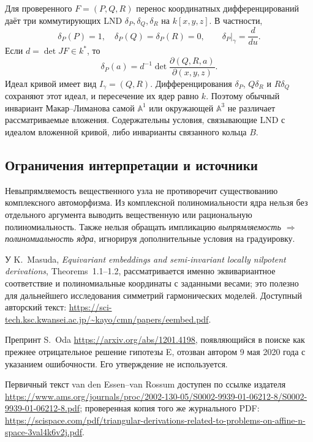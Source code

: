 Для проверенного $F=(P,Q,R)$ перенос координатных дифференцирований
даёт три коммутирующих LND $\delta_P,\delta_Q,\delta_R$ на
$k[x,y,z]$. В частности,
\[
 \delta_P(P)=1,\quad \delta_P(Q)=\delta_P(R)=0,
 \qquad\delta_P|_{\gamma}=\frac{d}{du}.
\]
Если $d=\det JF\in k^*$, то
\[
 \delta_P(a)=d^{-1}\det\frac{\partial(Q,R,a)}{\partial(x,y,z)}.
\]
Идеал кривой имеет вид $I_\gamma=(Q,R)$. Дифференцирования
$\delta_P$, $Q\delta_R$ и $R\delta_Q$ сохраняют этот идеал, и
пересечение их ядер равно $k$. Поэтому обычный инвариант
Макар--Лиманова самой $\mathbb A^1$ или окружающей $\mathbb A^3$
не различает рассматриваемые вложения. Содержательны условия,
связывающие LND с идеалом вложенной кривой, либо инварианты
связанного кольца $B$.

\subsection{Ограничения интерпретации и источники}

Невыпрямляемость вещественного узла не противоречит существованию
комплексного автоморфизма. Из комплексной полиномиальности ядра
нельзя без отдельного аргумента выводить вещественную или рациональную
полиномиальность. Также нельзя обращать импликацию
\emph{выпрямляемость $\Rightarrow$ полиномиальность ядра}, игнорируя
дополнительные условия на градуировку.

У K.~Masuda, \emph{Equivariant embeddings and semi-invariant locally
nilpotent derivations}, Theorems~1.1--1.2, рассматривается именно
эквивариантное соответствие и полиномиальные координаты с заданными
весами; это полезно для дальнейшего исследования симметрий гармонических
моделей. Доступный авторский текст:
\url{https://sci-tech.ksc.kwansei.ac.jp/~kayo/cmn/papers/eembed.pdf}.

Препринт S.~Oda \url{https://arxiv.org/abs/1201.4198}, появляющийся
в поиске как прежнее отрицательное решение гипотезы E, отозван автором
9 мая 2020 года с указанием ошибочности. Его утверждение не используется.

Первичный текст van den Essen--van Rossum доступен по ссылке издателя
\url{https://www.ams.org/journals/proc/2002-130-05/S0002-9939-01-06212-8/S0002-9939-01-06212-8.pdf};
проверенная копия того же журнального PDF:
\url{https://scispace.com/pdf/triangular-derivations-related-to-problems-on-affine-n-space-3val4k6v2j.pdf}.
